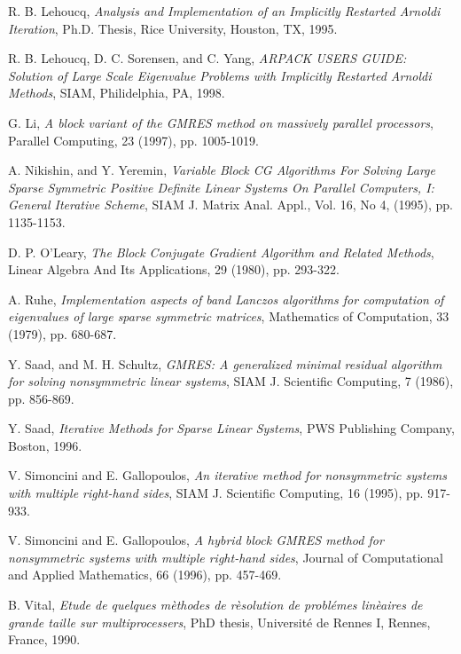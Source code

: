 \documentclass[twoside]{siamltex}
\begin{document}
\begin{thebibliography}{AAAA99}
 R. B. Lehoucq, {\em Analysis and Implementation
of an Implicitly Restarted Arnoldi Iteration}, Ph.D. Thesis, Rice
University, Houston, TX, 1995.

 R. B. Lehoucq, D. C. Sorensen, and C. Yang,
{\em ARPACK USERS GUIDE: Solution of Large Scale Eigenvalue
Problems with Implicitly Restarted Arnoldi Methods}, SIAM,
Philidelphia, PA, 1998.

 G. Li, {\em A block variant of the GMRES
method on massively parallel processors}, Parallel Computing, 23
(1997), pp. 1005-1019.

 A. Nikishin, and Y. Yeremin, {\em Variable
Block CG Algorithms For Solving Large Sparse Symmetric Positive
Definite Linear Systems On Parallel Computers, I: General
Iterative Scheme}, SIAM J. Matrix Anal. Appl., Vol. 16, No 4,
(1995), pp. 1135-1153.

 D. P. O'Leary, {\em The Block Conjugate Gradient
Algorithm and Related Methods}, Linear Algebra And Its
Applications, 29 (1980), pp. 293-322.

 A. Ruhe, {\em Implementation aspects of band
Lanczos algorithms for computation of eigenvalues of large sparse
symmetric matrices}, Mathematics of Computation, 33 (1979), pp.
680-687.

 Y. Saad, and M. H. Schultz, {\em GMRES: A
generalized minimal residual algorithm for solving nonsymmetric
linear systems}, SIAM J. Scientific Computing, 7 (1986), pp.
856-869.

 Y. Saad, {\em Iterative Methods for Sparse
Linear Systems}, PWS Publishing Company, Boston, 1996.

 V. Simoncini and E. Gallopoulos, {\em An
iterative method for nonsymmetric systems with multiple right-hand
sides}, SIAM J. Scientific Computing, 16 (1995), pp. 917-933.

 V. Simoncini and E. Gallopoulos, {\em A
hybrid block GMRES method for nonsymmetric systems with multiple
right-hand sides}, Journal of Computational and Applied
Mathematics, 66 (1996), pp. 457-469.

 B. Vital, {\em Etude de quelques m\`{e}thodes de
r\`{e}solution de probl\'{e}mes lin\`{e}aires de grande taille sur
multiprocessers}, PhD thesis, Universit\'{e} de Rennes I, Rennes,
France, 1990.


\end{thebibliography}

%
%
\end{document}
